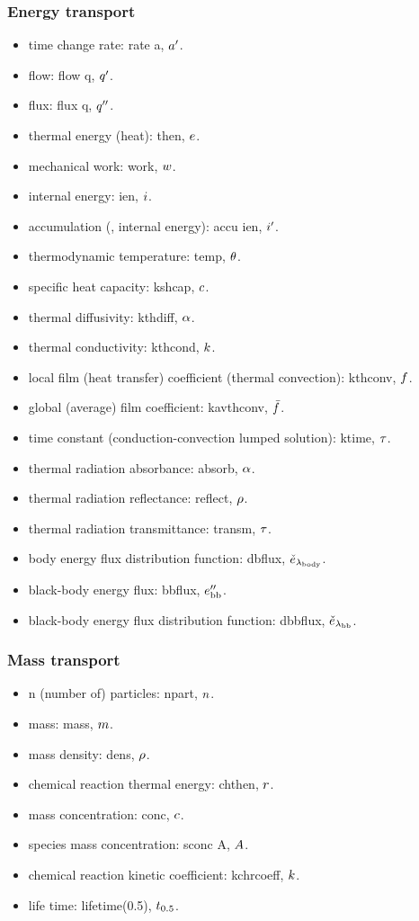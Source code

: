 \subsubsection{Energy transport}
\begin{itemize}
\item time change rate: rate a, ${a}^{\prime}$.
\item flow: flow q, ${q}^{\prime}$.
\item flux: flux q, ${q}^{\prime\prime}$.
\item thermal energy (heat): then, $e$.
\item mechanical work: work, $w$.
\item internal energy: ien, $i$.
\item accumulation (\eg, internal energy): accu ien, ${i}^{\prime}$.
\item thermodynamic temperature: temp, $\theta$.
\item specific heat capacity: kshcap, $c$.
\item thermal diffusivity: kthdiff, $\alpha$.
\item thermal conductivity: kthcond, $k$.
\item local film (heat transfer) coefficient (thermal convection): kthconv, $f$.
\item global (average) film coefficient: kavthconv, $\bar{f}$.
\item time constant (conduction-convection lumped solution): ktime, $\tau$.
\item thermal radiation absorbance: absorb, $\alpha$.
\item thermal radiation reflectance: reflect, $\rho$.
\item thermal radiation transmittance: transm, $\tau$.
\item body energy flux distribution function: dbflux, $\check{e}_{\lambda_\text{body}}$.
\item black-body energy flux: bbflux, ${e}^{\prime\prime}_\text{bb}$.
\item black-body energy flux distribution function: dbbflux, $\check{e}_{\lambda_\text{bb}}$.
\end{itemize}


\subsubsection{Mass transport}
\begin{itemize}
\item n (number of) particles: npart, $n$.
\item mass: mass, $m$.
\item mass density: dens, $\rho$.
\item chemical reaction thermal energy: chthen, $r$.
\item mass concentration: conc, $c$.
\item species mass concentration: sconc A, $A$.
\item chemical reaction kinetic coefficient: kchrcoeff, $k$.
\item life time: lifetime(0.5), $t_{0.5}$.
\end{itemize}


